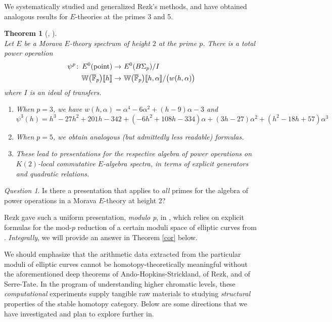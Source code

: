 \documentclass{rs}
\newtheorem{thm}[equation]{Theorem}
\theoremstyle{definition}
\theoremstyle{remark}
\newtheorem{ques}[equation]{Question}
\def\co{\colon\thinspace}
\newcommand{\mb}[1]{\mathbb{#1}}
\newcommand{\cF}{\overline {\mb F}}
\newcommand{\BW}{{\mb W}}
\newcommand{\pt}{{\rm point}}
\newcommand{\A}{\alpha}
\newcommand{\lb}{\llbracket}
\newcommand{\rb}{\rrbracket}
\renewcommand{\=}{\approx}
\renewcommand{\-}{\sim}
\numberwithin{equation}{section}
\begin{document}
We systematically studied and generalized Rezk's methods, and have obtained 
analogous results for $E$-theories at the primes 3 and 5.  

\begin{thm}[{\cite[Corollary 2.6 and Definition 3.8]{p3}, 
             \cite[Examples 3.4 and 6.1]{ho}}]
 \label{thm:p3}
 \mbox{}\\
 Let $E$ be a Morava $E$-theory spectrum of height $2$ at the prime $p$.  There 
 is a total power operation 
 \[
  \begin{split}
           \psi^p \co E^0(\pt) \to & ~ E^0(B\Sigma_p) / I \\
   \BW\big(\cF_p\big)\lb h \rb \to & ~ \BW\big(\cF_p\big)\lb h,\A \rb 
                                     / \big( w(h,\A) \big) 
  \end{split}
 \]
 where $I$ is an ideal of transfers.  

 \begin{enumerate}[{\em (i)}]
  \item When $p = 3$, we have $w(h,\A) = \A^4 - 6 \A^2 + (h - 9) \A - 3$ and 
  \[
   \psi^3(h) = h^3 - 27 h^2 + 201 h - 342 + (-6 h^2 + 108 h - 334) \A 
             + (3 h - 27) \A^2 + (h^2 - 18 h + 57) \A^3 
  \]

  \item When $p = 5$, we obtain analogous (but admittedly less readable) 
  formulas.  

  \item These lead to presentations for the respective algebra of power 
  operations on $K(2)$-local commutative $E$-algebra spectra, in terms of 
  explicit generators and quadratic relations.  
 \end{enumerate}
\end{thm}

\begin{ques}
 \label{q:dl}
 Is there a presentation that applies to {\em all} primes for the algebra of 
 power operations in a Morava $E$-theory at height 2?  
\end{ques}

Rezk gave such a uniform presentation, {\em modulo p}, in \cite{mc1}, which 
relies on explicit formulas for the mod-$p$ reduction of a certain moduli space 
of elliptic curves from \cite{KM}.  {\em Integrally}, we will provide an answer 
in Theorem \ref{cor} below.  

We should emphasize that the arithmetic data extracted from the particular 
moduli of elliptic curves cannot be homotopy-theoretically meaningful without 
the aforementioned deep theorems of Ando-Hopkins-Strickland, of Rezk, and of 
Serre-Tate.  In the program of understanding higher chromatic levels, these 
{\em computational} experiments supply tangible raw materials to studying 
{\em structural} properties of the stable homotopy category.  Below are some 
directions that we have investigated and plan to explore further in.  
\end{document}
